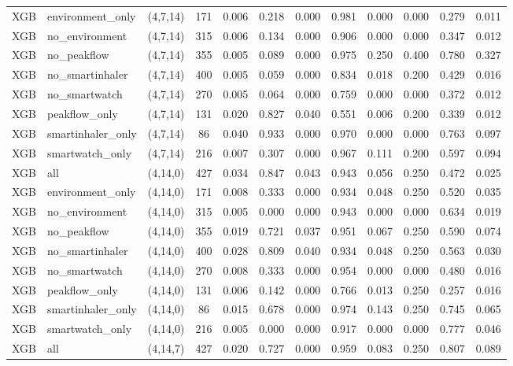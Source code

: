 \begin{longtable}{llcccccccccc}
XGB & environment\_only & (4,7,14) & 171 & 0.006 & 0.218 & 0.000 & 0.981 & 0.000 & 0.000 & 0.279 & 0.011 \\
XGB & no\_environment & (4,7,14) & 315 & 0.006 & 0.134 & 0.000 & 0.906 & 0.000 & 0.000 & 0.347 & 0.012 \\
XGB & no\_peakflow & (4,7,14) & 355 & 0.005 & 0.089 & 0.000 & 0.975 & 0.250 & 0.400 & 0.780 & 0.327 \\
XGB & no\_smartinhaler & (4,7,14) & 400 & 0.005 & 0.059 & 0.000 & 0.834 & 0.018 & 0.200 & 0.429 & 0.016 \\
XGB & no\_smartwatch & (4,7,14) & 270 & 0.005 & 0.064 & 0.000 & 0.759 & 0.000 & 0.000 & 0.372 & 0.012 \\
XGB & peakflow\_only & (4,7,14) & 131 & 0.020 & 0.827 & 0.040 & 0.551 & 0.006 & 0.200 & 0.339 & 0.012 \\
XGB & smartinhaler\_only & (4,7,14) & 86 & 0.040 & 0.933 & 0.000 & 0.970 & 0.000 & 0.000 & 0.763 & 0.097 \\
XGB & smartwatch\_only & (4,7,14) & 216 & 0.007 & 0.307 & 0.000 & 0.967 & 0.111 & 0.200 & 0.597 & 0.094 \\
XGB & all & (4,14,0) & 427 & 0.034 & 0.847 & 0.043 & 0.943 & 0.056 & 0.250 & 0.472 & 0.025 \\
XGB & environment\_only & (4,14,0) & 171 & 0.008 & 0.333 & 0.000 & 0.934 & 0.048 & 0.250 & 0.520 & 0.035 \\
XGB & no\_environment & (4,14,0) & 315 & 0.005 & 0.000 & 0.000 & 0.943 & 0.000 & 0.000 & 0.634 & 0.019 \\
XGB & no\_peakflow & (4,14,0) & 355 & 0.019 & 0.721 & 0.037 & 0.951 & 0.067 & 0.250 & 0.590 & 0.074 \\
XGB & no\_smartinhaler & (4,14,0) & 400 & 0.028 & 0.809 & 0.040 & 0.934 & 0.048 & 0.250 & 0.563 & 0.030 \\
XGB & no\_smartwatch & (4,14,0) & 270 & 0.008 & 0.333 & 0.000 & 0.954 & 0.000 & 0.000 & 0.480 & 0.016 \\
XGB & peakflow\_only & (4,14,0) & 131 & 0.006 & 0.142 & 0.000 & 0.766 & 0.013 & 0.250 & 0.257 & 0.016 \\
XGB & smartinhaler\_only & (4,14,0) & 86 & 0.015 & 0.678 & 0.000 & 0.974 & 0.143 & 0.250 & 0.745 & 0.065 \\
XGB & smartwatch\_only & (4,14,0) & 216 & 0.005 & 0.000 & 0.000 & 0.917 & 0.000 & 0.000 & 0.777 & 0.046 \\
XGB & all & (4,14,7) & 427 & 0.020 & 0.727 & 0.000 & 0.959 & 0.083 & 0.250 & 0.807 & 0.089 \\

\end{longtable}
